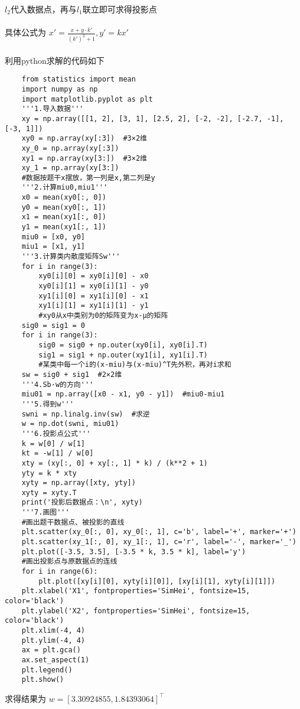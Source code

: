 \documentclass[UTF8]{ctexart}
\begin{document}
$l_2$代入数据点，再与$l_1$联立即可求得投影点
\\
\\
具体公式为 $\displaystyle{x'=\frac{x+y·k'}{(k')^2 +1}},
    y'=kx'$
\\
\\
利用python求解的代码如下
\\
\begin{lstlisting}
    from statistics import mean
    import numpy as np
    import matplotlib.pyplot as plt
    '''1.导入数据'''
    xy = np.array([[1, 2], [3, 1], [2.5, 2], [-2, -2], [-2.7, -1], [-3, 1]])
    xy0 = np.array(xy[:3])  #3×2维
    xy_0 = np.array(xy[:3])
    xy1 = np.array(xy[3:])  #3×2维
    xy_1 = np.array(xy[3:])
    #数据按题干x摆放，第一列是x,第二列是y
    '''2.计算miu0,miu1'''
    x0 = mean(xy0[:, 0])
    y0 = mean(xy0[:, 1])
    x1 = mean(xy1[:, 0])
    y1 = mean(xy1[:, 1])
    miu0 = [x0, y0]
    miu1 = [x1, y1]
    '''3.计算类内散度矩阵Sw'''
    for i in range(3):
        xy0[i][0] = xy0[i][0] - x0
        xy0[i][1] = xy0[i][1] - y0
        xy1[i][0] = xy1[i][0] - x1
        xy1[i][1] = xy1[i][1] - y1
        #xy0从x中类别为0的矩阵变为x-μ的矩阵
    sig0 = sig1 = 0
    for i in range(3):
        sig0 = sig0 + np.outer(xy0[i], xy0[i].T)
        sig1 = sig1 + np.outer(xy1[i], xy1[i].T)
        #某类中每一个i的(x-miu)与(x-miu)^T先外积，再对i求和
    sw = sig0 + sig1  #2×2维
    '''4.Sb·w的方向'''
    miu01 = np.array([x0 - x1, y0 - y1])  #miu0-miu1
    '''5.得到w'''
    swni = np.linalg.inv(sw)  #求逆
    w = np.dot(swni, miu01)
    '''6.投影点公式'''
    k = w[0] / w[1]
    kt = -w[1] / w[0]
    xty = (xy[:, 0] + xy[:, 1] * k) / (k**2 + 1)
    yty = k * xty
    xyty = np.array([xty, yty])
    xyty = xyty.T
    print('投影后数据点：\n', xyty)
    '''7.画图'''
    #画出题干数据点、被投影的直线
    plt.scatter(xy_0[:, 0], xy_0[:, 1], c='b', label='+', marker='+')
    plt.scatter(xy_1[:, 0], xy_1[:, 1], c='r', label='-', marker='_')
    plt.plot([-3.5, 3.5], [-3.5 * k, 3.5 * k], label='y')
    #画出投影点与原数据点的连线
    for i in range(6):
        plt.plot([xy[i][0], xyty[i][0]], [xy[i][1], xyty[i][1]])
    plt.xlabel('X1', fontproperties='SimHei', fontsize=15, color='black')
    plt.ylabel('X2', fontproperties='SimHei', fontsize=15, color='black')
    plt.xlim(-4, 4)
    plt.ylim(-4, 4)
    ax = plt.gca()
    ax.set_aspect(1)
    plt.legend()
    plt.show()
\end{lstlisting}

求得结果为
$w=[3.30924855,1.84393064]^\top $
\end{document}
